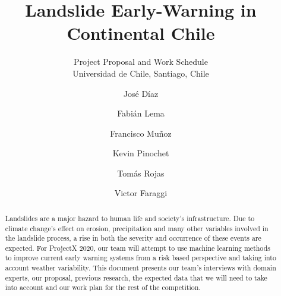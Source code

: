 \documentclass[sigconf, nonacm]{acmart}
\begin{document}
\title{Landslide Early-Warning in Continental Chile}
\subtitle{Project Proposal and Work Schedule \\
Universidad de Chile, Santiago, Chile} 


\author{José Díaz}
\affiliation{}

\author{Fabián Lema}
\affiliation{}

\author{Francisco Muñoz}
\affiliation{}

\author{Kevin Pinochet}
\affiliation{}

\author{Tomás Rojas}
\affiliation{}

\author{Victor Faraggi}
\affiliation{}

\begin{abstract}

% 
Landslides are a major hazard to human life and society's infrastructure. Due to climate change's effect on erosion, precipitation and many other variables involved in the landslide process, a rise in both the severity and occurrence of these events are expected. For ProjectX 2020, our team will attempt to use machine learning methods to improve current early warning systems from a risk based perspective and taking into account weather variability. This document presents our team's interviews with domain experts, our proposal, previous research, the expected data that we will need to take into account and our work plan for the rest of the competition.



\end{abstract}
\end{document}
